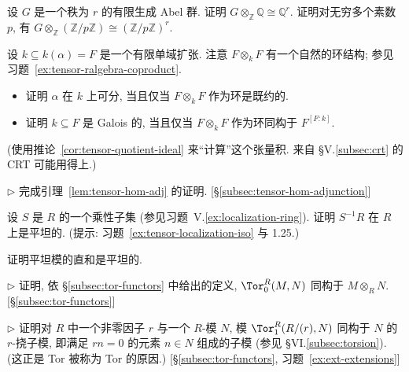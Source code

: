 \begin{prob}\label{ex:tensor-fg-ab-grp}
设 $G$ 是一个秩为 $r$ 的有限生成 Abel 群. 证明 $G\otimes_{\mathbb{Z}}\mathbb{Q}\cong\mathbb{Q}^r$. 证明对无穷多个素数 $p$, 有 $G\otimes_{\mathbb{Z}}(\mathbb{Z}/p\mathbb{Z})\cong(\mathbb{Z}/p\mathbb{Z})^r$.
\end{prob}

\begin{prob}\label{ex:tensor-field-ext-ring}
设 $k\subseteq k(\alpha)=F$ 是一个有限单域扩张. 注意 $F\otimes_k F$ 有一个自然的环结构; 参见习题~\ref{ex:tensor-ralgebra-coproduct}.
\begin{itemize}
\item 证明 $\alpha$ 在 $k$ 上可分, 当且仅当 $F\otimes_k F$ 作为环是既约的.
\item 证明 $k\subseteq F$ 是 Galois 的, 当且仅当 $F\otimes_k F$ 作为环同构于 $F^{[F:k]}$.
\end{itemize}
(使用推论~\ref{cor:tensor-quotient-ideal} 来``计算''这个张量积. 来自 §V.\ref{subsec:crt} 的 CRT 可能用得上.)
\end{prob}

\begin{prob}\label{ex:tensor-hom-adj-proof}
$\triangleright$ 完成引理~\ref{lem:tensor-hom-adj} 的证明. [\S\ref{subsec:tensor-hom-adjunction}]
\end{prob}

\begin{prob}\label{ex:tensor-localization-flat}
设 $S$ 是 $R$ 的一个乘性子集 (参见习题~V.\ref{ex:localization-ring}). 证明 $S^{-1}R$ 在 $R$ 上是平坦的. (提示: 习题~\ref{ex:tensor-localization-iso} 与 1.25.)
\end{prob}

\begin{prob}\label{ex:flat-direct-sum}
证明平坦模的直和是平坦的.
\end{prob}

\begin{prob}\label{ex:tor0-tensor}
$\triangleright$ 证明, 依 §\ref{subsec:tor-functors} 中给出的定义, $\Tor_0^R(M,N)$ 同构于 $M\otimes_R N$. [\S\ref{subsec:tor-functors}]
\end{prob}

\begin{prob}\label{ex:tor-torsion}
$\triangleright$ 证明对 $R$ 中一个非零因子 $r$ 与一个 $R$-模 $N$, 模 $\Tor_1^R(R/(r),N)$ 同构于 $N$ 的 $r$-挠子模, 即满足 $rn=0$ 的元素 $n\in N$ 组成的子模 (参见 §VI.\ref{subsec:torsion}). (这正是 Tor 被称为 Tor 的原因.) [§\ref{subsec:tor-functors}, 习题~\ref{ex:ext-extensions}]
\end{prob}

